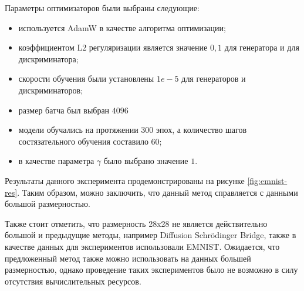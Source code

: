 Параметры оптимизаторов были выбраны следующие: 
\begin{itemize}
    \item используется AdamW в качестве алгоритма оптимизации;
    \item коэффициентом L2 регуляризации является значение $0,1$ для генератора и для дискриминатора;
    \item скорости обучения были установлены $1e-5$ для генераторов и дискриминаторов;
    \item размер батча был выбран $4096$
    \item модели обучались на протяжении $300$ эпох, а количество шагов состязательного обучения составило $60$;
    \item в качестве параметра $\gamma$ было выбрано значение $1$.
\end{itemize}

Результаты данного эксперимента продемонстрированы на рисунке \ref{fig:emnist-res}. Таким образом, можно заключить, что данный метод справляется с данными большой размерностью.

Также стоит отметить, что размерность 28x28 не является действительно большой и предыдущие методы, например Diffusion Schrödinger Bridge, также в качестве данных для экспериментов использовали EMNIST. Ожидается, что предложенный метод также можно использовать на данных большей размерностью, однако проведение таких экспериментов было не возможно в силу отсутствия вычислительных ресурсов.

\newpage
